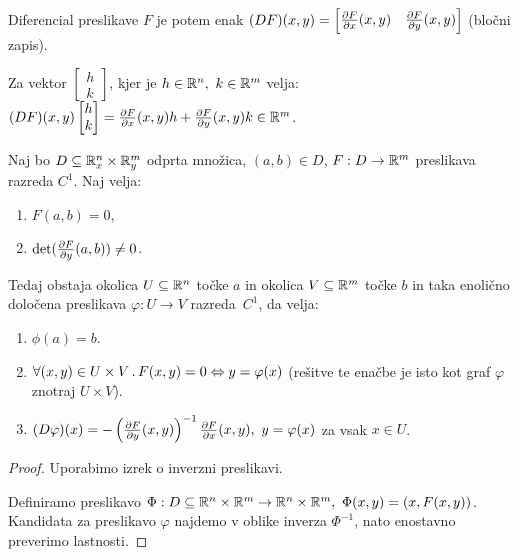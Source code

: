 Diferencial preslikave $F$ je potem enak $(DF)(x,y) = \begin{bmatrix}
    \frac{\partial F}{\partial x}(x,y) & \frac{\partial F}{\partial y}(x,y)
\end{bmatrix}$ (bločni zapis).

\begin{opomba}
    Za vektor $\begin{bmatrix}
        h \\ k
    \end{bmatrix}$, kjer je $h \in \mathbb{R}^n, \ k \in \mathbb{R}^m$ velja: $(DF)(x,y)  \begin{bmatrix}
        h \\ k
    \end{bmatrix} = \frac{\partial F}{\partial x}(x,y)  h + \frac{\partial F}{\partial y}(x,y)  k \in \mathbb{R}^m$.
\end{opomba}

\begin{izrek}
    Naj bo $D\subseteq \mathbb{R}_x^n \times \mathbb{R}_y^m$ odprta množica, $(a, b) \in D$, $F: D \to \mathbb{R}^m$ preslikava razreda $C^1$. Naj velja:
    \begin{enumerate}
        \item $F(a, b) = 0$,
        \item $\det(\frac{\partial F}{\partial y}(a,b)) \neq 0$.
    \end{enumerate}
    Tedaj obstaja okolica $U \subseteq \mathbb{R}^n$ točke $a$ in okolica $V \subseteq \mathbb{R}^m$ točke $b$ in taka enolično določena preslikava $\varphi: U \to V$ razreda~$C^1$, da velja:
    \begin{enumerate}
        \item $\phi(a) = b$.
        \item $\forall (x,y) \in U \times V \,.\, F(x,y) = 0 \Leftrightarrow y = \varphi(x)$ (rešitve te enačbe je isto kot graf $\varphi$ znotraj $U \times V$).
        \item $(D \varphi)(x) = - \left(\frac{\partial F}{\partial y}(x,y)\right)^{-1} \frac{\partial F}{\partial x}(x,y), \ y = \varphi(x)$ za vsak $x \in U$.
    \end{enumerate}
\end{izrek}

\begin{proof}
    Uporabimo izrek o inverzni preslikavi. 
    
    Definiramo preslikavo $\Phi: D \subseteq \mathbb{R}^n \times \mathbb{R}^m \to  \mathbb{R}^n \times \mathbb{R}^m, \ \Phi(x,y) = (x, F(x,y))$. Kandidata za preslikavo $\varphi$ najdemo v oblike inverza $\Phi^{-1}$, nato enostavno preverimo lastnosti.
\end{proof}

